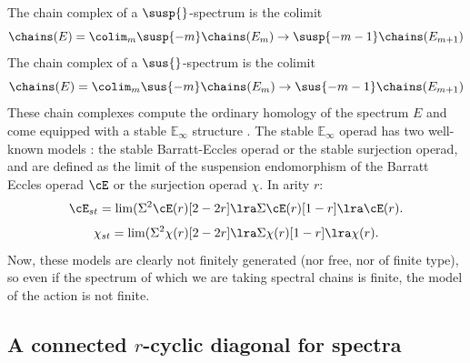 The chain complex of a $\susp{}$-spectrum is the colimit
\[
 \chains(E) = \colim_m \susp{-m} \chains(E_m) \to \susp{-m-1} \chains(E_{m+1})
\]
The chain complex of a $\sus{}$-spectrum is the colimit
\[
 \chains(E) = \colim_m \sus{-m} \chains(E_m) \to \sus{-m-1} \chains(E_{m+1})
\]
These chain complexes compute the ordinary homology of the spectrum $E$ and come equipped with a stable $\mathbb{E}_\infty$ structure \cite{Gill2020}. The stable $\mathbb{E}_\infty$ operad has two well-known models \cite[Appendix]{berger2004combinatorial}: the stable Barratt-Eccles operad or the stable surjection operad, and are defined as the limit of the suspension endomorphism of the Barratt Eccles operad $\cE$ or the surjection operad $\chi$. In arity $r$:
\[\cE_{st} = \lim( \Sigma^2\cE(r)[2-2r] \lra \Sigma \cE(r)[1-r] \lra \cE(r).\]
\[\chi_{st} = \lim( \Sigma^2\chi(r)[2-2r] \lra \Sigma \chi(r)[1-r] \lra \chi(r).\]
Now, these models are clearly not finitely generated (nor free, nor of finite type), so even if the spectrum of which we are taking spectral chains is finite, the model of the action is not finite. 


\subsection{A connected $r$-cyclic diagonal for spectra}


